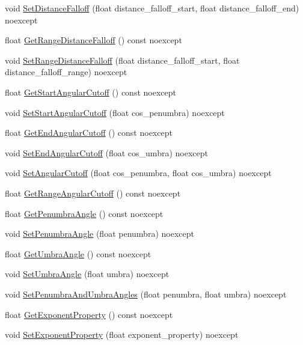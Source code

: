 \begin{DoxyCompactItemize}
\item 
void \hyperlink{classmage_1_1_spot_light_aa17cdc7e6950207f9fcb7d93497401d0}{Set\+Distance\+Falloff} (float distance\+\_\+falloff\+\_\+start, float distance\+\_\+falloff\+\_\+end) noexcept
\item 
float \hyperlink{classmage_1_1_spot_light_aa4d49da481b55080fff3e8f6094a6dcd}{Get\+Range\+Distance\+Falloff} () const noexcept
\item 
void \hyperlink{classmage_1_1_spot_light_ab25a82884ac4ad5293ef86314b28502e}{Set\+Range\+Distance\+Falloff} (float distance\+\_\+falloff\+\_\+start, float distance\+\_\+falloff\+\_\+range) noexcept
\item 
float \hyperlink{classmage_1_1_spot_light_ae221dd2747e65d01fcbf2a9b08c54abd}{Get\+Start\+Angular\+Cutoff} () const noexcept
\item 
void \hyperlink{classmage_1_1_spot_light_a16587c74a69e3e17ffdebbfb9f45d3da}{Set\+Start\+Angular\+Cutoff} (float cos\+\_\+penumbra) noexcept
\item 
float \hyperlink{classmage_1_1_spot_light_a9e1ec369a3f42a4662c4cde2aa4a9ac4}{Get\+End\+Angular\+Cutoff} () const noexcept
\item 
void \hyperlink{classmage_1_1_spot_light_aaec9faedf28add6d7d86ae89165b4aca}{Set\+End\+Angular\+Cutoff} (float cos\+\_\+umbra) noexcept
\item 
void \hyperlink{classmage_1_1_spot_light_a51bdd2f7294982f9a7e74aef6b19c461}{Set\+Angular\+Cutoff} (float cos\+\_\+penumbra, float cos\+\_\+umbra) noexcept
\item 
float \hyperlink{classmage_1_1_spot_light_a330d2d426b6f29a3c3e30fe0219bb9f2}{Get\+Range\+Angular\+Cutoff} () const noexcept
\item 
float \hyperlink{classmage_1_1_spot_light_a041dfc4fd7729d8d954f19af9debb3d1}{Get\+Penumbra\+Angle} () const noexcept
\item 
void \hyperlink{classmage_1_1_spot_light_af87723d2dc06e5d66c927516a45141ab}{Set\+Penumbra\+Angle} (float penumbra) noexcept
\item 
float \hyperlink{classmage_1_1_spot_light_a61d921afd94fbbf040cdb697d89c1a94}{Get\+Umbra\+Angle} () const noexcept
\item 
void \hyperlink{classmage_1_1_spot_light_a2941a409b850fe341c203c0189eae636}{Set\+Umbra\+Angle} (float umbra) noexcept
\item 
void \hyperlink{classmage_1_1_spot_light_ab4fee7e6685331be0e9b054ad457d808}{Set\+Penumbra\+And\+Umbra\+Angles} (float penumbra, float umbra) noexcept
\item 
float \hyperlink{classmage_1_1_spot_light_a0e92cc6201e2b9c8b2eb06c50a53ae13}{Get\+Exponent\+Property} () const noexcept
\item 
void \hyperlink{classmage_1_1_spot_light_aebe212a24ba81f744c74e9b6747031bd}{Set\+Exponent\+Property} (float exponent\+\_\+property) noexcept
\end{DoxyCompactItemize}
